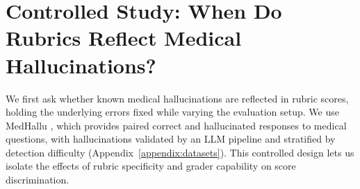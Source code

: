 \documentclass{article}
\begin{document}

\section{Controlled Study: When Do Rubrics Reflect Medical Hallucinations?}
\label{sec:medhallu}
We first ask whether known medical hallucinations are reflected in rubric scores, holding the underlying errors fixed while varying the evaluation setup. We use MedHallu \citep{pandit_medhallu_2025}, which provides paired correct and hallucinated responses to medical questions, with hallucinations validated by an LLM pipeline and stratified by detection difficulty (Appendix~\ref{appendix:datasets}). This controlled design lets us isolate the effects of rubric specificity and grader capability on score discrimination.
\end{document}
